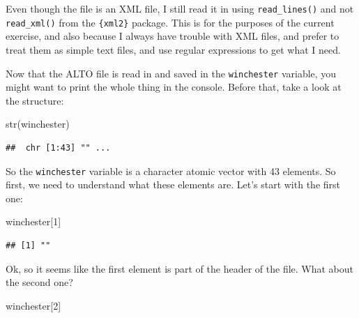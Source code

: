 \documentclass[
]{article}
\newenvironment{Shaded}{\begin{snugshade}}{\end{snugshade}}
\newcommand{\DecValTok}[1]{\textcolor[rgb]{0.00,0.00,0.81}{#1}}
\newcommand{\FunctionTok}[1]{\textcolor[rgb]{0.00,0.00,0.00}{#1}}
\newcommand{\NormalTok}[1]{#1}
\begin{document}
Even though the file is an XML file, I still read it in using \texttt{read\_lines()} and not \texttt{read\_xml()}
from the \texttt{\{xml2\}} package. This is for the purposes of the current exercise, and also because I
always have trouble with XML files, and prefer to treat them as simple text files, and use regular
expressions to get what I need.

Now that the ALTO file is read in and saved in the \texttt{winchester} variable, you might want to print
the whole thing in the console. Before that, take a look at the structure:

\begin{Shaded}
\begin{Highlighting}[]
\FunctionTok{str}\NormalTok{(winchester)}
\end{Highlighting}
\end{Shaded}

\begin{verbatim}
##  chr [1:43] "" ...
\end{verbatim}

So the \texttt{winchester} variable is a character atomic vector with 43 elements. So first, we need to
understand what these elements are. Let's start with the first one:

\begin{Shaded}
\begin{Highlighting}[]
\NormalTok{winchester[}\DecValTok{1}\NormalTok{]}
\end{Highlighting}
\end{Shaded}

\begin{verbatim}
## [1] ""
\end{verbatim}

Ok, so it seems like the first element is part of the header of the file. What about the second one?

\begin{Shaded}
\begin{Highlighting}[]
\NormalTok{winchester[}\DecValTok{2}\NormalTok{]}
\end{Highlighting}
\end{Shaded}
\end{document}
